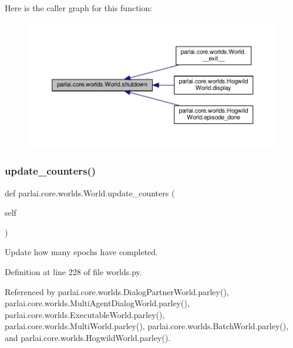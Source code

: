 Here is the caller graph for this function\+:
\nopagebreak
\begin{figure}[H]
\begin{center}
\leavevmode
\includegraphics[width=350pt]{classparlai_1_1core_1_1worlds_1_1World_a7e7e5a27569323dd334b87df6fef31e6_icgraph}
\end{center}
\end{figure}
\mbox{\label{classparlai_1_1core_1_1worlds_1_1World_a77730e92a331274ab7b6ea3e7b99d1a4}} 
\subsubsection{\texorpdfstring{update\+\_\+counters()}{update\_counters()}}
{\footnotesize\ttfamily def parlai.\+core.\+worlds.\+World.\+update\+\_\+counters (\begin{DoxyParamCaption}\item[{}]{self }\end{DoxyParamCaption})}

\begin{DoxyVerb}Update how many epochs have completed.\end{DoxyVerb}
 

Definition at line 228 of file worlds.\+py.



Referenced by parlai.\+core.\+worlds.\+Dialog\+Partner\+World.\+parley(), parlai.\+core.\+worlds.\+Multi\+Agent\+Dialog\+World.\+parley(), parlai.\+core.\+worlds.\+Executable\+World.\+parley(), parlai.\+core.\+worlds.\+Multi\+World.\+parley(), parlai.\+core.\+worlds.\+Batch\+World.\+parley(), and parlai.\+core.\+worlds.\+Hogwild\+World.\+parley().

